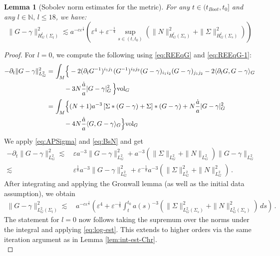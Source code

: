 \documentclass[11pt,leqno,textwidth=10cm]{amsart}
\numberwithin{equation}{section}
\theoremstyle{definition}
\theoremstyle{plain}
\newtheorem{lemma}[definition]{Lemma}
\newcommand{\1}{\mathbbm{1}}
\newcommand{\N}{\mathbb{N}}
\newcommand{\vol}[1]{{\text{\normalfont{vol}}}_{#1}}
\renewcommand{\epsilon}{\varepsilon}
\newcommand{\del}{\partial}
\begin{document}
\begin{lemma}[Sobolev norm estimates for the metric]\label{lem:norm-est-G} For any $t\in(t_{Boot},t_0]$ and any $l\in\N,\,l\leq 18$, we have:
\begin{equation}\label{eq:norm-est-G}
\|G-\gamma\|_{H^l_G(\Sigma_t)}^2\lesssim a^{-c\epsilon^\frac18}\left(\epsilon^4+\epsilon^{-\frac14}\sup_{s\in(t,t_0)}\left(\|N\|_{H^{l}_G(\Sigma_s)}^2+\|\Sigma\|_{H^{l}_G(\Sigma_s)}^2\right)\right)
\end{equation}
\end{lemma}
\begin{proof}
For $l=0$, we compute the following using \eqref{eq:REEqG} and \eqref{eq:REEqG-1}:
\begin{align*}
-\del_t\|G-\gamma\|_{L^2_G}^2=&\,\int_M\Bigr\{-2(\del_tG^{-1})^{i_1j_1}(G^{-1})^{i_2j_2}(G-\gamma)_{i_1i_2}(G-\gamma)_{j_1j_2}-2\langle\del_tG,G-\gamma\rangle_G\\
&\,\phantom{\int_M}-3N\frac{\dot{a}}a\lvert G-\gamma\rvert_G^2\,\Bigr\}\vol{G}\\
=&\,\int_M \Bigr\{(N+1)a^{-3} \left[\Sigma\ast(G-\gamma)+\Sigma\right]\ast(G-\gamma)+N\frac{\dot{a}}a\lvert G-\gamma\rvert_G^2\\
&\,\phantom{\int_M}-4N\frac{\dot{a}}a\langle G,G-\gamma\rangle_G\Bigr\}\vol{G}
\end{align*}
We apply \eqref{eq:APSigma} and \eqref{eq:BsN} and get
\begin{align*}
-\del_t\|G-\gamma\|_{L^2_G}^2\lesssim&\,\epsilon a^{-3}\|G-\gamma\|_{L^2_G}^2+a^{-3}\left(\|\Sigma\|_{L^2_G}+\|N\|_{L^2_G}\right)\|G-\gamma\|_{L^2_G}\\
\lesssim&\,\epsilon^\frac18 a^{-3}\|G-\gamma\|_{L^2_G}^2+\epsilon^{-\frac18}a^{-3}\left(\|\Sigma\|_{L^2_G}^2+\|N\|_{L^2_G}^2\right)\,.
\end{align*}
After integrating and applying the Gronwall lemma (as well as the initial data assumption), we obtain
\begin{align*}
\|G-\gamma\|_{L^2_G(\Sigma_t)}^2\lesssim&\, a^{-c\epsilon^\frac18}\left(\epsilon^4+\epsilon^{-\frac18}\int_t^{t_0}a(s)^{-3}\left(\|\Sigma\|_{L^2_G(\Sigma_s)}^2+\|N\|_{L^2_G(\Sigma_s)}^2\right)\,ds\right)\,.
\end{align*}
The statement for $l=0$ now follows taking the supremum over the norms under the integral and applying \eqref{eq:log-est}. This extends to higher orders via the same iteration argument as in Lemma \ref{lem:int-est-Chr}.\\


\end{proof}
\end{document}
